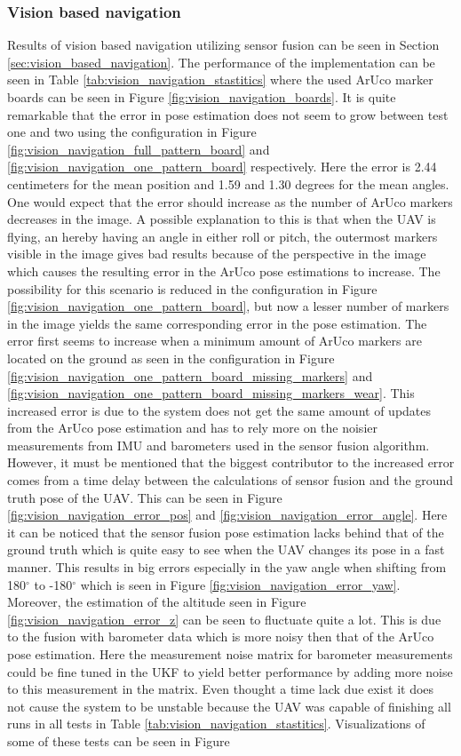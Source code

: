 \documentclass[../Head/report.tex]{subfiles}
\begin{document}
\subsubsection*{Vision based navigation}
Results of vision based navigation utilizing sensor fusion can be seen in Section \ref{sec:vision_based_navigation}. The performance of the implementation can be seen in Table \ref{tab:vision_navigation_stastitics} where the used ArUco marker boards can be seen in Figure \ref{fig:vision_navigation_boards}. It is quite remarkable that the error in pose estimation does not seem to grow between test one and two using the configuration in Figure \ref{fig:vision_navigation_full_pattern_board} and \ref{fig:vision_navigation_one_pattern_board} respectively. Here the error is 2.44 centimeters for the mean position and 1.59 and 1.30 degrees for the mean angles. One would expect that the error should increase as the number of ArUco markers decreases in the image. A possible explanation to this is that when the UAV is flying, an hereby having an angle in either roll or pitch, the outermost markers visible in the image gives bad results because of the perspective in the image which causes the resulting error in the ArUco pose estimations to increase. The possibility for this scenario is reduced in the configuration in Figure \ref{fig:vision_navigation_one_pattern_board}, but now a lesser number of markers in the image yields the same corresponding error in the pose estimation. The error first seems to increase when a minimum amount of ArUco markers are located on the ground as seen in the configuration in Figure \ref{fig:vision_navigation_one_pattern_board_missing_markers} and \ref{fig:vision_navigation_one_pattern_board_missing_markers_wear}. This increased error is due to the system does not get the same amount of updates from the ArUco pose estimation and has to rely more on the noisier measurements from IMU and barometers used in the sensor fusion algorithm. However, it must be mentioned that the biggest contributor to the increased error comes from a time delay between the calculations of sensor fusion and the ground truth pose of the UAV. This can be seen in Figure \ref{fig:vision_navigation_error_pos} and \ref{fig:vision_navigation_error_angle}. Here it can be noticed that the sensor fusion pose estimation lacks behind that of the ground truth which is quite easy to see when the UAV changes its pose in a fast manner. This results in big errors especially in the yaw angle when shifting from 180$^{\circ}$ to -180$^{\circ}$ which is seen in Figure \ref{fig:vision_navigation_error_yaw}. Moreover, the estimation of the altitude seen in Figure \ref{fig:vision_navigation_error_z} can be seen to fluctuate quite a lot. This is due to the fusion with barometer data which is more noisy then that of the ArUco pose estimation. Here the measurement noise matrix for barometer measurements could be fine tuned in the UKF to yield better performance by adding more noise to this measurement in the matrix. Even thought a time lack due exist it does not cause the system to be unstable because the UAV was capable of finishing all runs in all tests in Table \ref{tab:vision_navigation_stastitics}. Visualizations of some of these tests can be seen in Figure 
\end{document}

